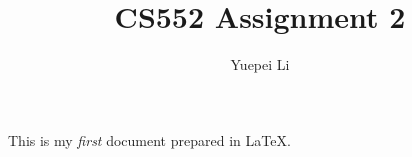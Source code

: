 \documentclass{article}
\title{CS552 Assignment 2}
\author{Yuepei Li}
\begin{document}
\maketitle

This is my \emph{first} document prepared in \LaTeX.
\end{document}
